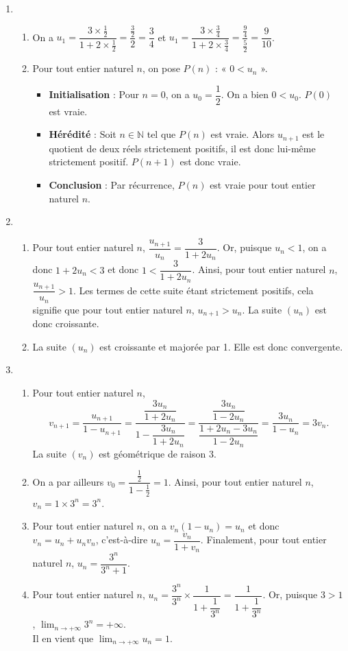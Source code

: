 \documentclass[11pt,fleqn, openany]{book} %
\begin{document}
\begin{solution}\hspace{0pt}
\begin{enumerate} \item 
\begin{enumerate}
\item On a $u_1=\dfrac{3\times\frac{1}{2}}{1+2\times \frac{1}{2}}=\dfrac{\frac{3}{2}}{2}=\dfrac{3}{4}$ et $u_1=\dfrac{3\times\frac{3}{4}}{1+2\times \frac{3}{4}}=\dfrac{\frac{9}{4}}{\frac{5}{2}}=\dfrac{9}{10}$.
\item Pour tout entier naturel $n$, on pose $P(n)$ : « $0<u_n$ ».
\begin{itemize}
\item \textbf{Initialisation} :  Pour $n=0$, on a $u_0=\dfrac{1}{2}$. On a bien $0<u_0$. $P(0)$ est vraie.
\item \textbf{Hérédité} : Soit $n\in\mathbb{N}$ tel que $P(n)$ est vraie. Alors $u_{n+1}$ est le quotient de deux réels strictement positifs, il est donc lui-même strictement positif. $P(n+1)$ est donc vraie.
\item \textbf{Conclusion} : Par récurrence, $P(n)$ est vraie pour tout entier naturel $n$.
\end{itemize}
\end{enumerate}
\item 
\begin{enumerate}
\item Pour tout entier naturel $n$, $\dfrac{u_{n+1}}{u_n}=\dfrac{3}{1+2u_n}$. Or, puisque $u_n<1$, on a donc $1+2u_n < 3$ et donc $1 < \dfrac{3}{1+2u_n}$. Ainsi, pour tout entier naturel $n$, $\dfrac{u_{n+1}}{u_n}>1$. Les termes de cette suite étant strictement positifs, cela signifie que pour tout entier naturel $n$, $u_{n+1}>u_n$. La suite $(u_n)$ est donc croissante.
\item La suite $(u_n)$ est croissante et majorée par 1. Elle est donc convergente.
\end{enumerate}
\item 
\begin{enumerate}
\item Pour tout entier naturel $n$,
\[v_{n+1}=\dfrac{u_{n+1}}{1-u_{n+1}}=\dfrac{\dfrac{3u_n}{1+2u_n}}{1-\dfrac{3u_n}{1+2u_n}}=\dfrac{\dfrac{3u_n}{1-2u_n}}{\dfrac{1+2u_n-3u_n}{1-2u_n}}=\dfrac{3u_n}{1-u_n}=3v_n.\]
La suite $(v_n)$ est géométrique de raison 3.
\item On a par ailleurs $v_0=\dfrac{\frac{1}{2}}{1-\frac{1}{2}}=1$. Ainsi, pour tout entier naturel $n$, $v_n = 1 \times 3^n = 3^n$.
\item Pour tout entier naturel $n$, on a $v_n(1-u_n)=u_n$ et donc $v_n=u_n+u_nv_n$, c'est-à-dire $u_n=\dfrac{v_n}{1+v_n}$. Finalement, pour tout entier naturel $n$, $u_n=\dfrac{3^n}{3^n+1}$.
\item Pour tout entier naturel $n$, $u_n = \dfrac{3^n}{3^n} \times \dfrac{1}{1+\dfrac{1}{3^n}} = \dfrac{1}{1+\dfrac{1}{3^n}}$. Or, puisque $3>1$, $\displaystyle\lim_{n\to+\infty}3^n=+\infty$.\\ Il en vient que $\displaystyle\lim_{n\to+\infty}u_n=1$.
\end{enumerate}
\end{enumerate}
\end{solution}
\end{document}
